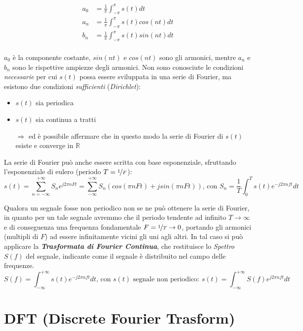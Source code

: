 \begin{align}
a_0 &= \frac{1}{\pi} \int_{-\pi}^{\pi} s(t)dt\\
a_n &= \frac{1}{\pi} \int_{-\pi}^{\pi} s(t)cos(nt)dt\\
b_n &= \frac{1}{\pi} \int_{-\pi}^{\pi} s(t)sin(nt)dt\\
\end{align}

$a_0$ è la componente costante, $sin(nt)$ e $cos(nt)$ sono gli armonici, mentre $a_n$ e $b_n$ sono le rispettive ampiezze degli armonici.
Non sono conosciute le condizioni \textit{necessarie} per cui $s(t)$ possa essere sviluppata in una serie di Fourier, ma esistono due condizioni \textit{sufficienti} (\textit{Dirichlet}):

\begin{itemize}
\item $s(t)$ sia periodica
\item $s(t)$ sia continua a tratti
\item[$\Rightarrow$] ed è possibile affermare che in questo modo la serie di Fourier di $s(t)$ esiste e converge in $\mathbb{R}$
\end{itemize}

La serie di Fourier può anche essere scritta con base esponenziale, sfruttando l'esponenziale di eulero (periodo $T = \nicefrac{1}{F}$):
\[s(t) = \sum_{n=-\infty}^{+\infty}S_n e^{j 2 \pi n F t} = \sum_{-\infty}^{+\infty}S_n(cos(\pi n F t) + jsin(\pi n F t))\text{, con }S_n = \frac{1}{T}\int_{0}^{T}s(t) e^{- j 2 \pi n f t}dt\]


Qualora un segnale fosse non periodico non se ne può ottenere la serie di Fourier, in quanto per un tale segnale avremmo che il periodo tendente ad infinito $T\rightarrow\infty$ e di conseguenza una frequenza fondamentale $F = \nicefrac{1}{T} \rightarrow 0$, portando gli armonici (multipli di $F$) ad essere infinitamente vicini gli uni agli altri.
In tal caso si può applicare la \textit{\textbf{Trasformata di Fourier Continua}}, che restituisce lo \textit{Spettro} $S(f)$ del segnale, indicante come il segnale è distribuito nel campo delle frequenze.
\[S(f) = \int_{-\infty}^{+\infty}s(t) e^{- j 2 \pi n f t}dt\text{, con }s(t)\text{ segnale non periodico: } s(t) = \int_{-\infty}^{+\infty}S(f) e^{ j 2 \pi n f t}dt\]

\section{DFT (Discrete Fourier Trasform)}

